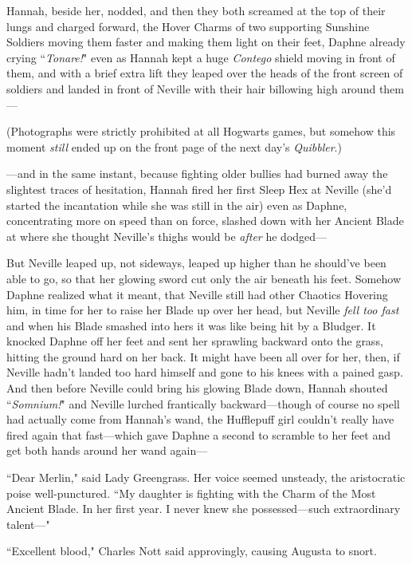 Hannah, beside her, nodded, and then they both screamed at the top of their lungs and charged forward, the Hover Charms of two supporting Sunshine Soldiers moving them faster and making them light on their feet, Daphne already crying ``\emph{Tonare!}" even as Hannah kept a huge \emph{Contego} shield moving in front of them, and with a brief extra lift they leaped over the heads of the front screen of soldiers and landed in front of Neville with their hair billowing high around them—

(Photographs were strictly prohibited at all Hogwarts games, but somehow this moment \emph{still} ended up on the front page of the next day's \emph{Quibbler}.)

—and in the same instant, because fighting older bullies had burned away the slightest traces of hesitation, Hannah fired her first Sleep Hex at Neville (she'd started the incantation while she was still in the air) even as Daphne, concentrating more on speed than on force, slashed down with her Ancient Blade at where she thought Neville's thighs would be \emph{after} he dodged—

But Neville leaped up, not sideways, leaped up higher than he should've been able to go, so that her glowing sword cut only the air beneath his feet. Somehow Daphne realized what it meant, that Neville still had other Chaotics Hovering him, in time for her to raise her Blade up over her head, but Neville \emph{fell too fast} and when his Blade smashed into hers it was like being hit by a Bludger. It knocked Daphne off her feet and sent her sprawling backward onto the grass, hitting the ground hard on her back. It might have been all over for her, then, if Neville hadn't landed too hard himself and gone to his knees with a pained gasp. And then before Neville could bring his glowing Blade down, Hannah shouted ``\emph{Somnium!}" and Neville lurched frantically backward—though of course no spell had actually come from Hannah's wand, the Hufflepuff girl couldn't really have fired again that fast—which gave Daphne a second to scramble to her feet and get both hands around her wand again—

\later

``Dear Merlin," said Lady Greengrass. Her voice seemed unsteady, the aristocratic poise well-punctured. ``My daughter is fighting with the Charm of the Most Ancient Blade. In her first year. I never knew she possessed—such extraordinary talent—"

``Excellent blood," Charles Nott said approvingly, causing Augusta to snort.

